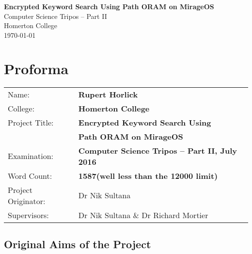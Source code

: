 \documentclass[12pt,a4paper,twoside,openright]{report}
\begin{document}




\pagestyle{empty}


\vspace*{60mm}
\begin{center}
\Huge
\textbf{Encrypted Keyword Search Using Path ORAM on MirageOS} \\[5mm]
Computer Science Tripos -- Part II \\[5mm]
Homerton College \\[5mm]
\today  %
\end{center}


\pagestyle{plain}

\chapter*{Proforma}

{\large
\begin{tabular}{ll}
Name:               & \bf Rupert Horlick                       \\
College:            & \bf Homerton College                     \\
Project Title:      & \bf Encrypted Keyword Search Using \\
& \bf Path ORAM on MirageOS \\
Examination:        & \bf Computer Science Tripos -- Part II, July 2016  \\
Word Count:         & \bf 1587\footnotemark[1]
                      (well less than the 12000 limit)  \\
Project Originator: & Dr Nik Sultana                    \\
Supervisors:         & Dr Nik Sultana \& Dr Richard Mortier                    \\ 
\end{tabular}
}


\section*{Original Aims of the Project}
\end{document}
